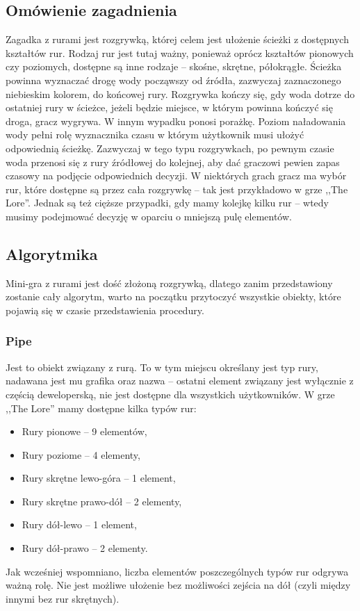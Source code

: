 \documentclass[oneside,polski,logo]{amuthesis}
\begin{document}
\subsection{Omówienie zagadnienia}
\par Zagadka z rurami jest rozgrywką, której celem jest ułożenie ścieżki z dostępnych kształtów rur. Rodzaj rur jest tutaj ważny, ponieważ oprócz kształtów pionowych czy poziomych, dostępne są inne rodzaje – skośne, skrętne, półokrągłe.
Ścieżka powinna wyznaczać drogę wody począwszy od źródła, zazwyczaj zaznaczonego niebieskim kolorem, do końcowej rury. Rozgrywka kończy się, gdy woda dotrze do ostatniej rury w ścieżce, jeżeli będzie miejsce, w którym powinna kończyć się droga, gracz wygrywa. W innym wypadku ponosi porażkę.
Poziom naładowania wody pełni rolę wyznacznika czasu w którym użytkownik musi ułożyć odpowiednią ścieżkę. Zazwyczaj w tego typu rozgrywkach, po pewnym czasie woda przenosi się z rury źródłowej do kolejnej, aby dać graczowi pewien zapas czasowy na podjęcie odpowiednich decyzji. W niektórych grach gracz ma wybór rur, które dostępne są przez cała rozgrywkę – tak jest przykładowo w grze ,,The Lore''. Jednak są też cięższe przypadki, gdy mamy kolejkę kilku rur – wtedy musimy podejmować decyzję w oparciu o mniejszą pulę elementów.
\subsection{Algorytmika}
\par Mini-gra z rurami jest dość złożoną rozgrywką, dlatego zanim przedstawiony zostanie cały algorytm, warto na początku przytoczyć wszystkie obiekty, które pojawią się w czasie przedstawienia procedury.
\subsubsection{Pipe}
\par Jest to obiekt związany z rurą. To w tym miejscu określany jest typ rury, nadawana jest mu grafika oraz nazwa – ostatni element związany jest wyłącznie z częścią deweloperską, nie jest dostępne dla wszystkich użytkowników. W grze ,,The Lore'' mamy dostępne kilka typów rur:
\begin{itemize}
  \item Rury pionowe – 9 elementów,
  \item Rury poziome – 4 elementy,
  \item Rury skrętne lewo-góra – 1 element,
  \item Rury skrętne prawo-dół – 2 elementy,
  \item Rury dół-lewo –  1 element,
  \item Rury dół-prawo – 2 elementy.
\end{itemize}
Jak wcześniej wspomniano, liczba elementów poszczególnych typów rur odgrywa ważną rolę. Nie jest możliwe ułożenie bez możliwości zejścia na dół (czyli między innymi bez rur skrętnych). 
\end{document}
